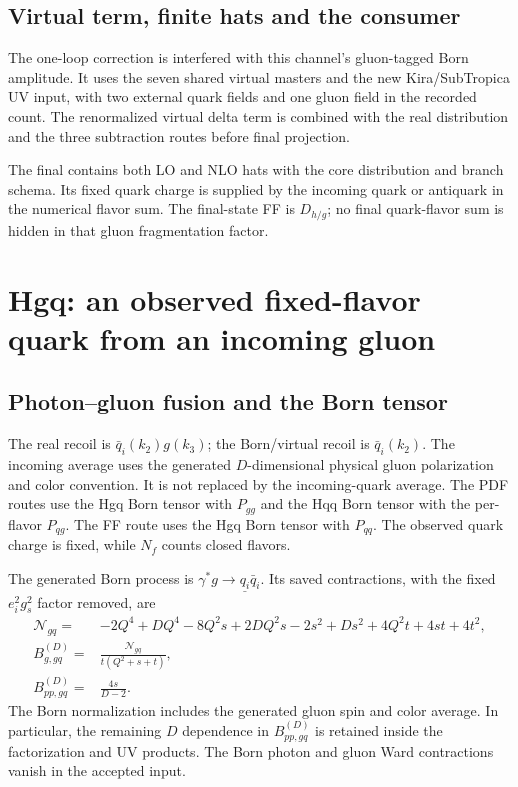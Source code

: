 \documentclass[11pt,a4paper]{article}
\newcommand{\obs}[1]{\underline{#1}}
\begin{document}
\subsection{Virtual term, finite hats and the consumer}

The one-loop correction is interfered with this channel's gluon-tagged
Born amplitude. It uses the seven shared virtual masters and the new
Kira/SubTropica UV input, with two external quark fields and one gluon
field in the recorded count. The renormalized virtual delta term is
combined with the real distribution and the three subtraction routes
before final projection.

The final  contains both LO and NLO hats with
the core distribution and branch schema. Its fixed quark charge is
supplied by the incoming quark or antiquark in the numerical flavor sum.
The final-state FF is $D_{h/g}$; no final quark-flavor sum is hidden in
that gluon fragmentation factor.

\section{Hgq: an observed fixed-flavor quark from an incoming gluon}
\label{sec:hgq}

\subsection{Photon--gluon fusion and the Born tensor}

The real recoil is $\bar q_i(k_2)g(k_3)$; the Born/virtual recoil is
$\bar q_i(k_2)$. The incoming average uses the generated $D$-dimensional
physical gluon polarization and color convention. It is not replaced by
the incoming-quark average.
The PDF routes use the Hgq Born tensor with $P_{gg}$ and the Hqq Born
tensor with the per-flavor $P_{qg}$. The FF route uses the Hgq Born tensor
with $P_{qq}$. The observed quark charge is fixed, while $N_f$ counts
closed flavors.

The generated Born process is $\gamma^*g\to\obs{q_i}\bar q_i$.
Its saved contractions, with the fixed $e_i^2g_s^2$ factor removed,
are
\begin{align}
 \mathcal N_{gq}={}&-2Q^4+DQ^4-8Q^2s+2DQ^2s-2s^2+Ds^2
                   +4Q^2t+4st+4t^2,\\
 B_{g,gq}^{(D)}={}&\frac{\mathcal N_{gq}}{t(Q^2+s+t)},\\
 B_{pp,gq}^{(D)}={}&\frac{4s}{D-2}.
 \label{eq:borngq}
\end{align}
The Born normalization includes the generated gluon spin and color
average. In particular, the remaining $D$ dependence in
$B_{pp,gq}^{(D)}$ is retained inside the factorization and UV products.
The Born photon and gluon Ward contractions vanish in the accepted input.
\end{document}
